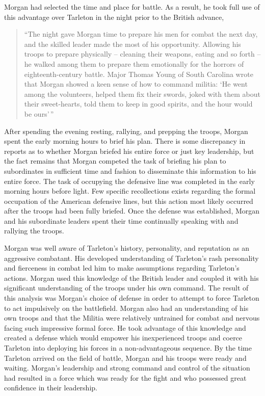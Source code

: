 Morgan had selected the time and place for battle. As a result, he took full
use of this advantage over Tarleton in the night prior to the British advance,

\begin{quote}
  ``The night gave Morgan time to prepare his men for combat the next day, and
  the skilled leader made the most of his opportunity. Allowing his troops to
  prepare physically -- cleaning their weapons, eating and so forth -- he walked
  among them to prepare them emotionally for the horrors of eighteenth-century
  battle. Major Thomas Young of South Carolina wrote that Morgan showed a keen
  sense of how to command militia: `He went among the volunteers, helped them
  fix their swords, joked with them about their sweet-hearts, told them to keep
  in good spirits, and the hour would be ours'\,'' \cite[47]{moncure_cowpens_1996}
\end{quote}

After spending the evening resting, rallying, and prepping the troops, Morgan
spent the early morning hours to brief his plan. There is some discrepancy in
reports as to whether Morgan briefed his entire force or just key leadership,
but the fact remains that Morgan competed the task of briefing his plan to
subordinates in sufficient time and fashion to disseminate this information to
his entire force. The task of occupying the defensive line was completed in the
early morning hours before light. Few specific recollections exists regarding
the formal occupation of the American defensive lines, but this action most
likely occurred after the troops had been fully briefed. Once the defense was
established, Morgan and his subordinate leaders spent their time continually
speaking with and rallying the troops.

Morgan was well aware of Tarleton's history, personality, and reputation as an
aggressive combatant. His developed understanding of Tarleton's rash
personality and fierceness in combat led him to make assumptions regarding
Tarleton's actions. Morgan used this knowledge of the British leader and
coupled it with his significant understanding of the troops under his own
command. The result of this analysis was Morgan's choice of defense in order to
attempt to force Tarleton to act impulsively on the battlefield. Morgan also had
an understanding of his own troops and that the Militia were relatively
untrained for combat and nervous facing such impressive formal force. He took
advantage of this knowledge and created a defense which would empower his
inexperienced troops and coerce Tarleton into deploying his forces in a
non-advantageous sequence. By the time Tarleton arrived on the field of battle,
Morgan and his troops were ready and waiting. Morgan's leadership and strong
command and control of the situation had resulted in a force which was ready
for the fight and who possessed great confidence in their leadership.


